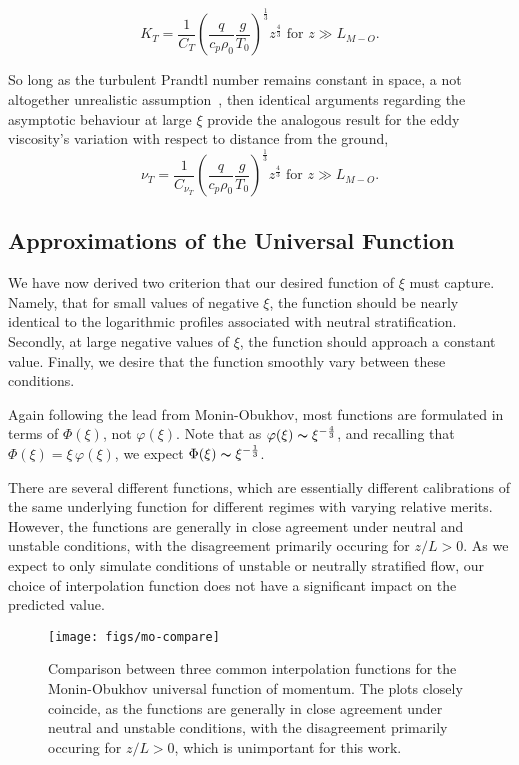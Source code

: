 \begin{equation}
 K_T = \frac{1}{C_T} \left( \frac{q}{c_p \rho_0} \frac{g}{T_0}
		     \right)^\frac{1}{3} z^{\frac{4}{3}}  \text{ 
for } z \gg L_{M-O}. 
\end{equation}

So long as the turbulent Prandtl number remains constant in space, a not
altogether unrealistic assumption~\cite{chuang1969turbulent}, then
identical arguments regarding the asymptotic behaviour at large $\xi$
provide the analogous result for the eddy viscosity's variation with
respect to distance from the ground,   
\begin{equation}
 \nu_T = \frac{1}{C_{\nu_T}} \left( \frac{q}{c_p \rho_0} \frac{g}{T_0}
			     \right)^\frac{1}{3} z^{\frac{4}{3}}  \text{ 
for } z \gg L_{M-O}. 
\end{equation}


\subsection*{Approximations of the Universal Function}

We have now derived two criterion that our desired function of $\xi$ 
must capture. Namely, that for small values of negative $\xi$, the
function should be nearly identical to the logarithmic profiles
associated with neutral stratification. Secondly, at large negative
values of $\xi$, the function should approach a constant value. Finally,
we desire that the function smoothly vary between these conditions. 

Again following the lead from Monin-Obukhov, most functions are
formulated in terms of $\Phi(\xi)$, not $\varphi(\xi)$. Note that as
$\varphi(\xi) \thicksim \xi^{-\frac{4}{3}}$, and recalling that
$\Phi(\xi) = \xi \, \varphi(\xi)$, we expect 
$\Phi(\xi) \thicksim \xi^{-\frac{1}{3}}$.

There are several different functions, which are essentially different
calibrations of the same underlying function for different regimes with 
varying relative merits. %
However, the functions are generally in close agreement under neutral
and unstable conditions, with the disagreement primarily occuring for
$z/L>0$. As we expect to only simulate conditions  of unstable or
neutrally stratified flow, our choice of interpolation function does not
have a significant impact on the predicted value.  

\begin{figure}[!htb]
 \centering
  \texttt{[image: figs/mo-compare]}\\
 \caption{Comparison between three common interpolation functions for
 the Monin-Obukhov universal function of momentum. The plots closely
 coincide, as the functions are generally in close agreement under
 neutral and unstable conditions, with the disagreement primarily
 occuring for $z/L>0$, which is unimportant for this work.} 
 \label{fig:interp-mo}
\end{figure}

